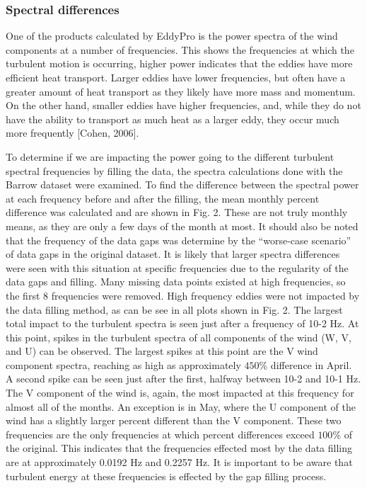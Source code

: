  \subsubsection{Spectral differences}
One of the products calculated by EddyPro is the power spectra of the wind components at a number of frequencies. This shows the frequencies at which the turbulent motion is occurring, higher power indicates that the eddies have more efficient heat transport. Larger eddies have lower frequencies, but often have a greater amount of heat transport as they likely have more mass and momentum. On the other hand, smaller eddies have higher frequencies, and, while they do not have the ability to transport as much heat as a larger eddy, they occur much more frequently [Cohen, 2006]. 

To determine if we are impacting the power going to the different turbulent spectral frequencies by filling the data, the spectra calculations done with the Barrow dataset were examined. To find the difference between the spectral power at each frequency before and after the filling, the mean monthly percent difference was calculated and are shown in Fig. 2. These are not truly monthly means, as they are only a few days of the month at most. It should also be noted that the frequency of the data gaps was determine by the “worse-case scenario” of data gaps in the original dataset. It is likely that larger spectra differences were seen with this situation at specific frequencies due to the regularity of the data gaps and filling. 
Many missing data points existed at high frequencies, so the first 8 frequencies were removed. High frequency eddies were not impacted by the data filling method, as can be see in all plots shown in Fig. 2. The largest total impact to the turbulent spectra is seen just after a frequency of 10-2 Hz. At this point, spikes in the turbulent spectra of all components of the wind (W, V, and U) can be observed. The largest spikes at this point are the V wind component spectra, reaching as high as approximately $450\%$ difference in April. A second spike can be seen just after the first, halfway between 10-2 and 10-1 Hz. The V component of the wind is, again, the most impacted at this frequency for almost all of the months. An exception is in May, where the U component of the wind has a slightly larger percent different than the V component. These two frequencies are the only frequencies at which percent differences exceed $100\%$ of the original. This indicates that the frequencies effected most by the data filling are at approximately 0.0192 Hz and 0.2257 Hz. It is important to be aware that turbulent energy at these frequencies is effected by the gap filling process.
 
